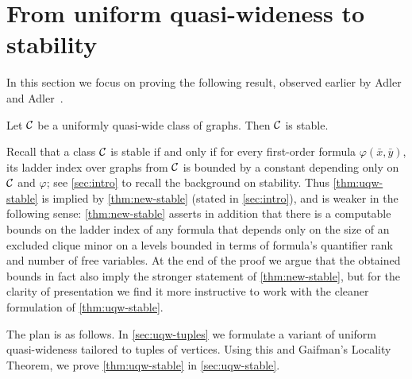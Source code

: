 
\section{From uniform quasi-wideness to stability}\label{sec:stable}

In this section we focus on proving the following result, observed earlier by Adler and Adler~\cite{adler2014interpreting}.

\begin{theorem}\label{thm:uqw-stable}
	Let $\cal C$ be a uniformly quasi-wide class of graphs.
	Then $\cal C$ is stable. %
\end{theorem}

Recall that a class $\cal C$ is stable if and only if for every first-order formula $\varphi(\bar x,\bar y)$, its ladder index over graphs from $\cal C$ is bounded by a constant depending only on $\cal C$ and $\varphi$;
see \cref{sec:intro} to recall the background on stability.
Thus \cref{thm:uqw-stable} is implied by \cref{thm:new-stable} (stated in \cref{sec:intro}), and is weaker in the following sense: \cref{thm:new-stable} asserts in addition that there is a computable bounds on the ladder index
of any formula that depends only on the size of an excluded clique minor on a levels bounded in terms of formula's quantifier rank and number of free variables. At the end of the proof we argue that
the obtained bounds in fact also imply the stronger statement of \cref{thm:new-stable}, but for the clarity of presentation we find it more instructive to work with the cleaner formulation of \cref{thm:uqw-stable}.

The plan is as follows. In \cref{sec:uqw-tuples} we formulate a variant of uniform quasi-wideness tailored to tuples of vertices. Using this and Gaifman's Locality Theorem, we prove \cref{thm:uqw-stable} in \cref{sec:uqw-stable}.


